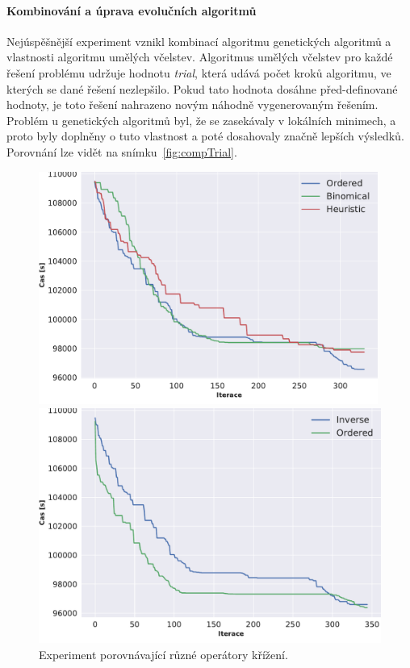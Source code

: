 \paragraph{Kombinování a úprava evolučních algoritmů}
Nejúspěšnější experiment vznikl kombinací algoritmu genetických algoritmů a vlastnosti algoritmu umělých včelstev. Algoritmus umělých včelstev pro každé řešení problému udržuje hodnotu \emph{trial}, která udává počet kroků algoritmu, ve kterých se dané řešení nezlepšilo. Pokud tato hodnota dosáhne před-definované hodnoty, je toto řešení nahrazeno novým náhodně vygenerovaným řešením. Problém u genetických algoritmů byl, že se zasekávaly v lokálních minimech, a proto byly doplněny o tuto vlastnost a poté dosahovaly značně lepších výsledků. Porovnání lze vidět na snímku~\ref{fig:compTrial}.

\begin{figure}[t]
    \centering
    \begin{minipage}{0.49\textwidth}
        \centering
        \includegraphics[width=0.99\textwidth]{figures/vyhodnoceni/plotComparisonCrossovers.pdf}
        \caption{Experiment porovnávající různé operátory křížení.}
        \label{fig:compCrossover}
    \end{minipage}\hfill
    \begin{minipage}{0.49\textwidth}
        \centering
        \includegraphics[width=1\textwidth]{figures/vyhodnoceni/plotComparisonMutations.pdf}

\end{minipage}
\end{figure}
